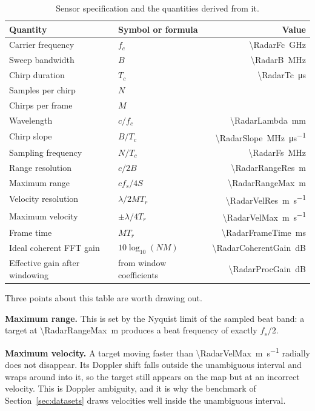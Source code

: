 \begin{table}[H]
\centering
\caption{Sensor specification and the quantities derived from it.}
\label{tab:radarspec}
\begin{tabular}{@{}llr@{}}
\toprule
\textbf{Quantity} & \textbf{Symbol or formula} & \textbf{Value} \\
\midrule
Carrier frequency & $f_c$ & \SI{\RadarFc}{\giga\hertz} \\
Sweep bandwidth & $B$ & \SI{\RadarB}{\mega\hertz} \\
Chirp duration & $T_c$ & \SI{\RadarTc}{\micro\second} \\
Samples per chirp & $N$ & \RadarN{} \\
Chirps per frame & $M$ & \RadarM{} \\
\midrule
Wavelength & $c/f_c$ & \SI{\RadarLambda}{\milli\metre} \\
Chirp slope & $B/T_c$ & \SI{\RadarSlope}{\mega\hertz\per\micro\second} \\
Sampling frequency & $N/T_c$ & \SI{\RadarFs}{\mega\hertz} \\
Range resolution & $c/2B$ & \SI{\RadarRangeRes}{\metre} \\
Maximum range & $c f_s / 4S$ & \SI{\RadarRangeMax}{\metre} \\
Velocity resolution & $\lambda/2MT_r$ & \SI{\RadarVelRes}{\metre\per\second} \\
Maximum velocity & $\pm\lambda/4T_r$ & \SI{\RadarVelMax}{\metre\per\second} \\
Frame time & $M T_r$ & \SI{\RadarFrameTime}{\milli\second} \\
\midrule
Ideal coherent FFT gain & $10\log_{10}(NM)$ & \SI{\RadarCoherentGain}{\deci\bel} \\
Effective gain after windowing & from window coefficients &
\SI{\RadarProcGain}{\deci\bel} \\
\bottomrule
\end{tabular}
\end{table}

Three points about this table are worth drawing out.

\textbf{Maximum range.} This is set by the Nyquist limit of the sampled beat band: a target at
\SI{\RadarRangeMax}{\metre} produces a beat frequency of exactly $f_s/2$.

\textbf{Maximum velocity.} A target moving faster than \SI{\RadarVelMax}{\metre\per\second}
radially does not disappear. Its Doppler shift falls outside the unambiguous interval and wraps
around into it, so the target still appears on the map but at an incorrect velocity. This is
Doppler ambiguity, and it is why the benchmark of Section~\ref{sec:datasets} draws velocities well
inside the unambiguous interval.

